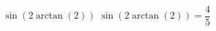  {$\sin\left(2\arctan\left(2\right)\right)$ }
{ $\sin\left(2\arctan\left(2\right)\right) = \dfrac{4}{5}$ }
